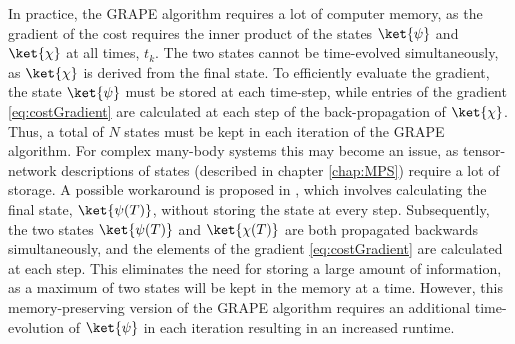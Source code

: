 In practice, the GRAPE algorithm requires a lot of computer memory, as the gradient of the cost requires the inner product of the states $\ket{\psi}$ and $\ket{\chi}$ at all times, $t_k$. The two states cannot be time-evolved simultaneously, as $\ket{\chi}$ is derived from the final state. To efficiently evaluate the gradient, the state $\ket{\psi}$ must be stored at each time-step, while entries of the gradient \eqref{eq:costGradient} are calculated at each step of the back-propagation of $\ket{\chi}$. Thus, a total of $N$ states must be kept in each iteration of the GRAPE algorithm. For complex many-body systems this may become an issue, as tensor-network descriptions of states (described in chapter \ref{chap:MPS}) require a lot of storage. A possible workaround is proposed in \cite{Mennemann2015}, which involves calculating the final state, $\ket{\psi (T)}$, without storing the state at every step. Subsequently, the two states $\ket{\psi (T)}$ and $\ket{\chi (T)}$ are both propagated backwards simultaneously, and the elements of the gradient \eqref{eq:costGradient} are calculated at each step. This eliminates the need for storing a large amount of information, as a maximum of two states will be kept in the memory at a time. However, this memory-preserving version of the GRAPE algorithm requires an additional time-evolution of $\ket{\psi}$ in each iteration resulting in an increased runtime.

